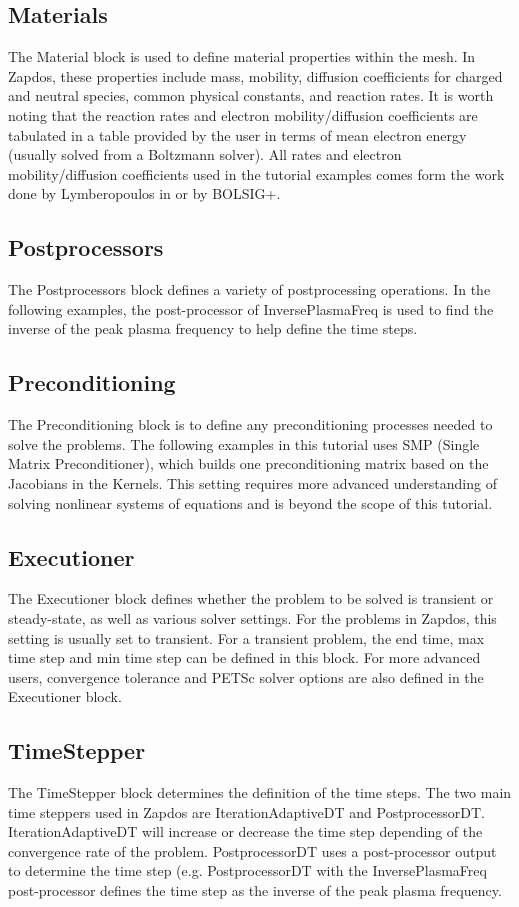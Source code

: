 \documentclass[final]{report}
\begin{document}
  \subsection{Materials}
  The Material block is used to define material properties within the mesh. In Zapdos, these properties include mass, mobility, diffusion coefficients for charged and neutral species, common physical constants, and reaction rates. It is worth noting that the reaction rates and electron mobility/diffusion coefficients are tabulated in a table provided by the user in terms of mean electron energy (usually solved from a Boltzmann solver). All rates and electron mobility/diffusion coefficients used in the tutorial examples comes form the work done by Lymberopoulos in \cite{1D_GEC} or by BOLSIG+.
  \subsection{Postprocessors}
  The Postprocessors block defines a variety of postprocessing operations. In the following examples, the post-processor of InversePlasmaFreq is used to find the inverse of the peak plasma frequency to help define the time steps.
  \subsection{Preconditioning}
  The Preconditioning block is to define any preconditioning processes needed to solve the problems. The following examples in this tutorial uses SMP (Single Matrix Preconditioner), which builds one preconditioning matrix based on the Jacobians in the Kernels. This setting requires more advanced understanding of solving nonlinear systems of equations and is beyond the scope of this tutorial.
  \subsection{Executioner}
  The Executioner block defines whether the problem to be solved is transient or steady-state, as well as various solver settings. For the problems in Zapdos, this setting is usually set to transient. For a transient problem, the end time, max time step and min time step can be defined in this block. For more advanced users, convergence tolerance and PETSc solver options are also defined in the Executioner block.
  \subsection{TimeStepper}
  The TimeStepper block determines the definition of the time steps. The two main time steppers used in Zapdos are IterationAdaptiveDT and PostprocessorDT. IterationAdaptiveDT will increase or decrease the time step depending of the convergence rate of the problem. PostprocessorDT uses a post-processor output to determine the time step (e.g. PostprocessorDT with the InversePlasmaFreq post-processor defines the time step as the inverse of the peak plasma frequency.
\end{document}
